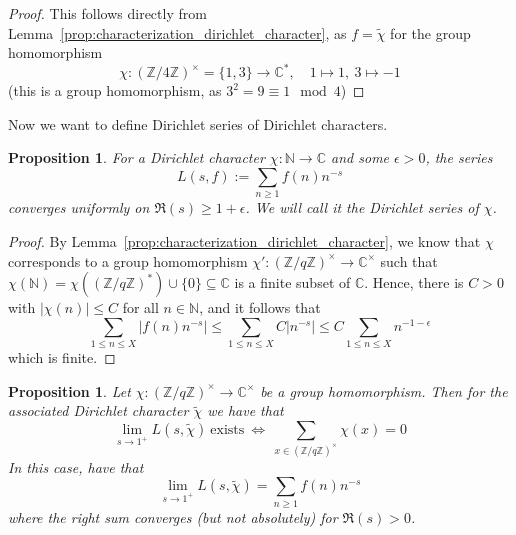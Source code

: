 \documentclass{scrartcl}
\newcommand{\N}{\mathbb{N}}
\newcommand{\Z}{\mathbb{Z}}
\newcommand{\C}{\mathbb{C}}
\newcommand{\units}{\times}
\newtheorem{proposition}[definition]{Proposition}
\begin{document}
\begin{proof}
    This follows directly from Lemma~\ref{prop:characterization_dirichlet_character}, as $f = \tilde{\chi}$ for the group homomorphism
    \begin{equation*}
        \chi: (\Z/4\Z)^\units = \{ 1, 3 \} \to \C^*, \quad 1 \mapsto 1, \ 3 \mapsto -1
    \end{equation*}
    (this is a group homomorphism, as $3^2 = 9 \equiv 1 \mod 4$)
\end{proof}
Now we want to define Dirichlet series of Dirichlet characters.
\begin{proposition}
    For a Dirichlet character $\chi: \N \to \C$ and some $\epsilon > 0$, the series
    \begin{equation*}
        L(s, f) := \sum_{n \geq 1} f(n) n^{-s}
    \end{equation*}
    converges uniformly on $\Re(s) \geq 1 + \epsilon$.
    We will call it the Dirichlet series of $\chi$.
\end{proposition}
\begin{proof}
    By Lemma~\ref{prop:characterization_dirichlet_character}, we know that $\chi$ corresponds to a group homomorphism $\chi': (\Z/q\Z)^\units \to \C^\units$ such that $\chi(\N) = \chi((\Z/q\Z)^*) \cup \{ 0 \} \subseteq \C$ is a finite subset of $\C$.
    Hence, there is $C > 0$ with $|\chi(n)| \leq C$ for all $n \in \N$, and it follows that
    \begin{equation*}
        \sum_{1 \leq n \leq X} \left| f(n) n^{-s} \right| \leq \sum_{1 \leq n \leq X} C \left| n^{-s} \right| \leq C \sum_{1 \leq n \leq X} n^{-1 - \epsilon}
    \end{equation*}
    which is finite.
\end{proof}
\begin{proposition}
    \label{prop:dirichlet_series_at_one}
    Let $\chi: (\Z/q\Z)^\units \to \C^\units$ be a group homomorphism. Then for the associated Dirichlet character $\tilde{\chi}$ we have that
    \begin{equation*}
        \lim_{s \to 1^+} L(s, \tilde{\chi}) \ \text{exists} \ \Leftrightarrow \ \sum_{x \in (\Z/q\Z)^\units} \chi(x) = 0
    \end{equation*}
    In this case, have that
    \begin{equation*}
        \lim_{s \to 1^+} L(s, \tilde{\chi}) = \sum_{n \geq 1} f(n) n^{-s}
    \end{equation*}
    where the right sum converges (but not absolutely) for $\Re(s) > 0$.
\end{proposition}
\end{document}

